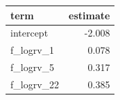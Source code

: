 \begin{tabular}{lr}
\toprule
term & estimate \\
\midrule
intercept & -2.008 \\
f_logrv_1 & 0.078 \\
f_logrv_5 & 0.317 \\
f_logrv_22 & 0.385 \\
\bottomrule
\end{tabular}
